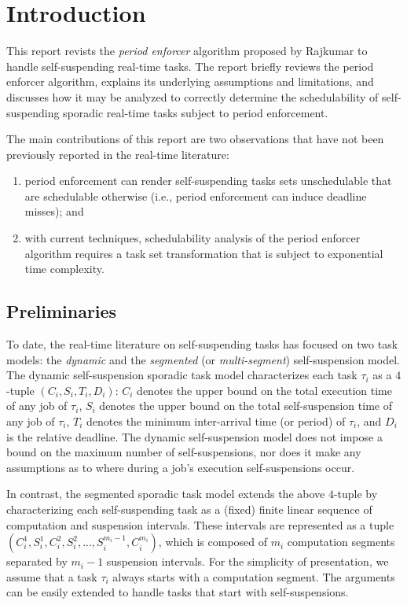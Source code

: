 


\section{Introduction} 
This report revists the \emph{period enforcer} algorithm proposed by Rajkumar \cite{Raj:suspension1991} to handle self-suspending real-time tasks. The report briefly reviews the period enforcer algorithm, explains its underlying assumptions and limitations, and discusses how it may be analyzed to correctly determine the schedulability of self-suspending sporadic real-time tasks subject to period enforcement. 

The main contributions of this report are two observations that have not been previously reported in the real-time literature:

\begin{enumerate}
	\item period enforcement can render self-suspending tasks sets unschedulable that are schedulable otherwise (i.e., period enforcement can induce deadline misses); and
	\item with current techniques, schedulability analysis of the period enforcer algorithm requires a task set transformation that is subject to exponential time complexity.
\end{enumerate}

\subsection{Preliminaries}

To date, the real-time literature on self-suspending tasks has focused on two task models: the \emph{dynamic} and the \emph{segmented} (or \emph{multi-segment}) self-suspension model. 
The dynamic self-suspension sporadic task model characterizes each
task $\tau_i$ as a $4$-tuple $(C_i,S_i,T_i,D_i)$: 
$C_i$ denotes the upper bound on the total execution time of any job of $\tau_i$,
$S_i$ denotes the upper bound on the total self-suspension time of any job of $\tau_i$,
$T_i$ denotes the minimum inter-arrival time (or period) of $\tau_i$, and $D_i$ is the relative deadline. The dynamic self-suspension model does not impose a bound on the maximum number of self-suspensions, nor does it make any assumptions as to where during a job's execution self-suspensions occur.

In contrast, the segmented sporadic task model extends the above $4$-tuple by characterizing each self-suspending task as a (fixed) finite linear sequence of computation and suspension intervals. These intervals are represented as a tuple
$(C_{i}^1,S_{i}^1,C_{i}^2,S_{i}^2,...,S_{i}^{m_i-1},C_{i}^{m_i})$, which is composed of $m_i$ computation segments separated by $m_i-1$ suspension intervals. For the simplicity of presentation, we assume that a task $\tau_i$ always starts with a computation segment. The arguments can be easily extended to handle tasks that start with self-suspensions.

